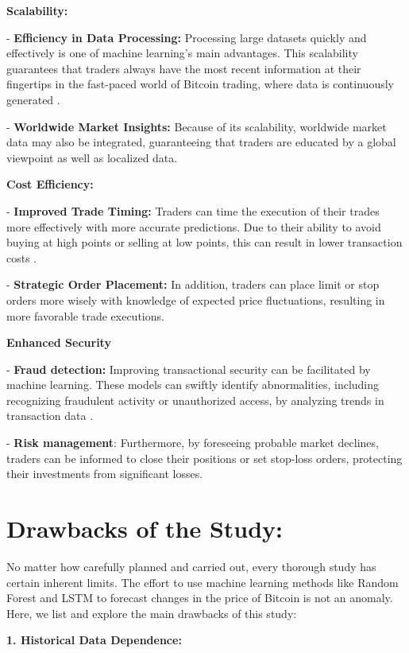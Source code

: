 \textbf{Scalability:}

-	\textbf{Efficiency in Data Processing:} Processing large datasets quickly and effectively is one of machine learning's main advantages. This scalability guarantees that traders always have the most recent information at their fingertips in the fast-paced world of Bitcoin trading, where data is continuously generated \citep{bao2017deep}.

-	\textbf{Worldwide Market Insights:} Because of its scalability, worldwide market data may also be integrated, guaranteeing that traders are educated by a global viewpoint as well as localized data.

\textbf{Cost Efficiency: }

-	\textbf{Improved Trade Timing:} Traders can time the execution of their trades more effectively with more accurate predictions. Due to their ability to avoid buying at high points or selling at low points, this can result in lower transaction costs \citep{hendershott2011does}.

-	\textbf{Strategic Order Placement: }In addition, traders can place limit or stop orders more wisely with knowledge of expected price fluctuations, resulting in more favorable trade executions.

\textbf{Enhanced Security}

-	\textbf{Fraud detection:} Improving transactional security can be facilitated by machine learning. These models can swiftly identify abnormalities, including recognizing fraudulent activity or unauthorized access, by analyzing trends in transaction data \citep{bahnsen2015example}.

-	\textbf{Risk management}: Furthermore, by foreseeing probable market declines, traders can be informed to close their positions or set stop-loss orders, protecting their investments from significant losses.

\section{Drawbacks of the Study:}

No matter how carefully planned and carried out, every thorough study has certain inherent limits. The effort to use machine learning methods like Random Forest and LSTM to forecast changes in the price of Bitcoin is not an anomaly. Here, we list and explore the main drawbacks of this study:

\textbf{1. Historical Data Dependence:}

